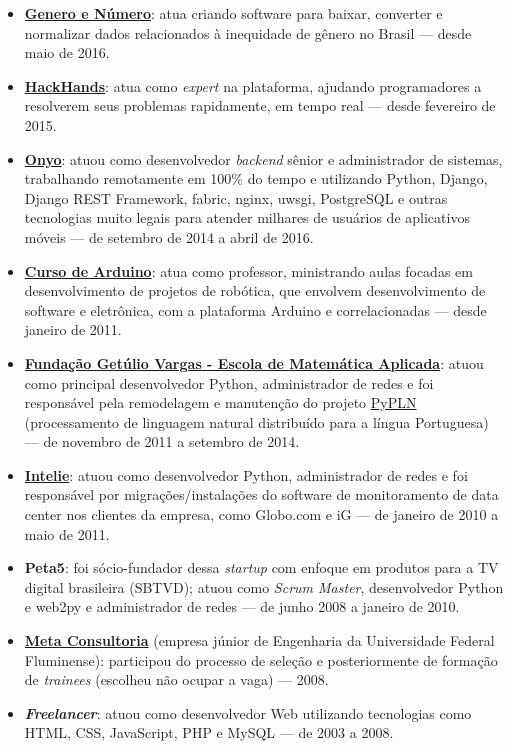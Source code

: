 \documentclass[a4paper,11pt]{article}
\begin{document}
	\begin{itemize}
		\item \href{http://generonumero.media}{\textbf{Genero e Número}}: atua
			criando software para baixar, converter e normalizar dados
			relacionados à inequidade de gênero no Brasil --- desde maio de
			2016.
		\item \href{http://hackhands.com}{\textbf{HackHands}}: atua como
			\textit{expert} na plataforma, ajudando programadores a resolverem
			seus problemas rapidamente, em tempo real --- desde fevereiro de
			2015.
		\item \href{http://onyo.com}{\textbf{Onyo}}: atuou como desenvolvedor
			\textit{backend} sênior e administrador de sistemas, trabalhando
			remotamente em 100\% do tempo e utilizando Python, Django, Django
			REST Framework, fabric, nginx, uwsgi, PostgreSQL e outras
			tecnologias muito legais para atender milhares de usuários de
			aplicativos móveis --- de setembro de 2014 a abril de 2016.
		\item \href{http://www.cursodearduino.com.br/}{\textbf{Curso de
			Arduino}}: atua como professor, ministrando aulas focadas em
			desenvolvimento de projetos de robótica, que envolvem
			desenvolvimento de software e eletrônica, com a plataforma Arduino
			e correlacionadas --- desde janeiro de 2011.
		\item \href{http://emap.fgv.br/}{\textbf{Fundação Getúlio Vargas -
			Escola de Matemática Aplicada}}: atuou como principal desenvolvedor
			Python, administrador de redes e foi responsável pela remodelagem e
			manutenção do projeto \href{http://pypln.org/}{PyPLN}
			(processamento de linguagem natural distribuído para a língua
			Portuguesa) --- de novembro de 2011 a setembro de 2014.
		\item \href{http://www.intelie.com.br/}{\textbf{Intelie}}: atuou como
			desenvolvedor Python, administrador de redes e foi responsável por
			migrações/instalações do software de monitoramento de data center
			nos clientes da empresa, como Globo.com e iG --- de janeiro de 2010
			a maio de 2011.
		\item \textbf{Peta5}: foi sócio-fundador dessa \textit{startup} com
			enfoque em produtos para a TV digital brasileira (SBTVD); atuou
			como \textit{Scrum Master}, desenvolvedor Python e web2py e
			administrador de redes --- de junho 2008 a janeiro de 2010.
		\item \href{http://www.metaconsultoria.com/}{\textbf{Meta Consultoria}}
			(empresa júnior de Engenharia da Universidade Federal Fluminense):
			participou do processo de seleção e posteriormente de formação de
			\textit{trainees} (escolheu não ocupar a vaga) --- 2008.
		\item \textbf{\textit{Freelancer}}: atuou como desenvolvedor Web
			utilizando tecnologias como HTML, CSS, JavaScript, PHP e MySQL ---
			de 2003 a 2008.
	\end{itemize}
\end{document}
